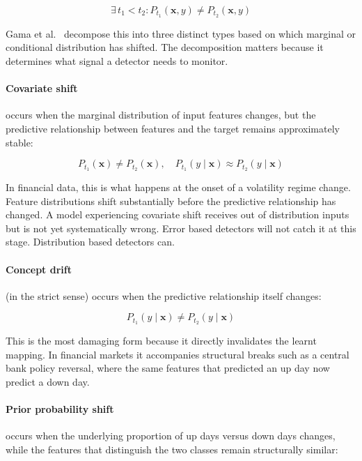 \begin{equation}
  \exists\, t_1 < t_2 : P_{t_1}(\mathbf{x}, y) \neq P_{t_2}(\mathbf{x}, y)
  \label{eq:drift_general}
\end{equation}

Gama et al.~\cite{gama2014survey} decompose this into three distinct types based on which marginal or conditional distribution has shifted. The decomposition matters because it determines what signal a detector needs to monitor.

\paragraph{Covariate shift} occurs when the marginal distribution of input features changes, but the predictive relationship between features and the target remains approximately stable:

\begin{equation}
  P_{t_1}(\mathbf{x}) \neq P_{t_2}(\mathbf{x}), \quad
  P_{t_1}(y \mid \mathbf{x}) \approx P_{t_2}(y \mid \mathbf{x})
  \label{eq:covariate_shift}
\end{equation}

In financial data, this is what happens at the onset of a volatility regime change. Feature distributions shift substantially before the predictive relationship has changed. A model experiencing covariate shift receives out of distribution inputs but is not yet systematically wrong. Error based detectors will not catch it at this stage. Distribution based detectors can.

\paragraph{Concept drift} (in the strict sense) occurs when the predictive relationship itself changes:

\begin{equation}
  P_{t_1}(y \mid \mathbf{x}) \neq P_{t_2}(y \mid \mathbf{x})
  \label{eq:concept_drift}
\end{equation}

This is the most damaging form because it directly invalidates the learnt mapping. In financial markets it accompanies structural breaks such as a central bank policy reversal, where the same features that predicted an up day now predict a down day.

\paragraph{Prior probability shift} occurs when the underlying proportion of up days versus down days changes, while the features that distinguish the two classes remain structurally similar:

